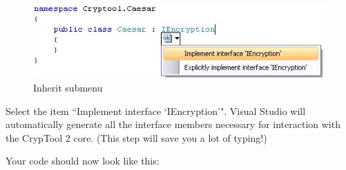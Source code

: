 \begin{figure}[h!]
	\centering
		\includegraphics{figures/inherit_submenu.jpg}
	\caption{Inherit submenu}
	\label{fig:inherit_submenu}
\end{figure}

Select the item ``Implement interface `IEncryption'". Visual Studio will automatically generate all the interface members necessary for interaction with the CrypTool 2 core. (This step will save you a lot of typing!)
\clearpage

\noindent Your code should now look like this:


